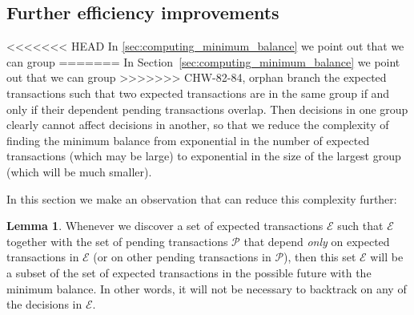 \documentclass{article}
\theoremstyle{definition}{
  \newtheorem{lemma}{Lemma}[section] %
  \newtheorem{definition}[lemma]{Definition}
}
\theoremstyle{theorem}{
  \newtheorem{invariant}[lemma]{Invariant}
  \newtheorem{proofobligation}[lemma]{Proof Obligation}
}
\newtheorem{lemma}{Lemma}[section] %
\numberwithin{equation}{lemma}
\begin{document}
\subsection{Further efficiency improvements}

<<<<<<< HEAD
In \cref{sec:computing_minimum_balance} we point out that we can group
=======
In Section~\ref{sec:computing_minimum_balance} we point out that we can group
>>>>>>> CHW-82-84, orphan branch
the expected transactions such that two expected transactions are in the same
group if and only if their dependent pending transactions overlap. Then
decisions in one group clearly cannot affect decisions in another, so that we
reduce the complexity of finding the minimum balance from exponential in the
number of expected transactions (which may be large) to exponential in the size
of the largest group (which will be much smaller).

In this section we make an observation that can reduce this complexity further:

\begin{lemma}
Whenever we discover a set of expected transactions $\mathcal{E}$ such that
$\mathcal{E}$ together with the set of pending transactions $\mathcal{P}$ that
depend \emph{only} on expected transactions in $\mathcal{E}$ (or on other
pending transactions in $\mathcal{P}$), then this set $\mathcal{E}$ will be a
subset of the set of expected transactions in the possible future with the
minimum balance. In other words, it will not be necessary to backtrack on any of
the decisions in $\mathcal{E}$.
\end{lemma}
\end{document}
